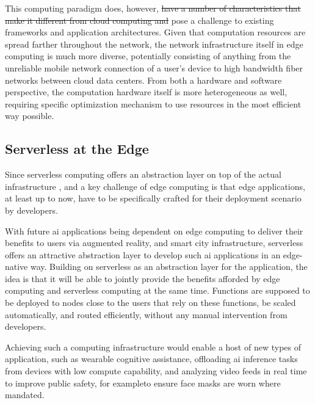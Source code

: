\documentclass[draft,final]{vutinfth} %
\providecommand{\DIFaddtex}[1]{{\protect\color{blue}\uwave{#1}}} %
\providecommand{\DIFdeltex}[1]{{\protect\color{red}\sout{#1}}}                      %
\providecommand{\DIFaddbegin}{} %
\providecommand{\DIFaddend}{} %
\providecommand{\DIFdelbegin}{} %
\providecommand{\DIFdelend}{} %
\providecommand{\DIFadd}[1]{\texorpdfstring{\DIFaddtex{#1}}{#1}} %
\providecommand{\DIFdel}[1]{\texorpdfstring{\DIFdeltex{#1}}{}} %
\begin{document}
This computing paradigm does, however, \DIFdelbegin \DIFdel{have a number of characteristics that make it different from cloud computing and }\DIFdelend pose a challenge to existing frameworks and application architectures.
Given that computation resources are spread  farther throughout the network, the network infrastructure itself in edge computing is much more diverse\cite{shiEdgeComputingVisionChallenges2016}, potentially consisting of anything from the unreliable mobile network connection of a user's device to high bandwidth fiber networks between cloud data centers.
From both a hardware and software perspective, the computation hardware itself is more heterogeneous as well, requiring specific optimization mechanism to use resources in the most efficient way possible\cite{abbasMobileEdgeComputing2018b}.

\subsection{Serverless at the Edge}
Since serverless computing offers an abstraction layer on top of the actual infrastructure \cite{jonasCloudProgrammingSimplified2019}, and a key challenge of edge computing is that edge applications, at least up to now, have to be specifically crafted for their deployment scenario by developers\cite{shiPromiseEdgeComputing2016}.

With future \gls{ai} applications being dependent on edge computing to deliver their benefits to users via augmented reality, and smart city infrastructure\cite{rauschEdgeIntelligenceConvergence2019}, serverless offers an attractive abstraction layer to develop such \gls{ai} applications in an edge-native way.
Building on serverless as an abstraction layer for the application, the idea is that it will be able to jointly provide the benefits afforded by edge computing and serverless computing at the same time.
Functions are supposed to be deployed to nodes close to the users that rely on these functions, be scaled automatically, and routed efficiently, without any manual intervention from developers.

Achieving such a computing infrastructure would enable a host of new types of application, such as wearable cognitive assistance\cite{haWearableCognitiveAssistance2014}\cite{rauschPlatformSmartCityScale2021}, offloading \gls{ai} inference tasks from devices with low compute capability\cite{liEdgeAIOnDemand2020}, and analyzing video feeds in real time to improve public safety\cite{zhangEdgeVideoAnalytics2019}, for example\DIFaddbegin \DIFadd{, }\DIFaddend to ensure face masks are worn where mandated\cite{wangWearMaskFastInbrowser2021}.
\end{document}
